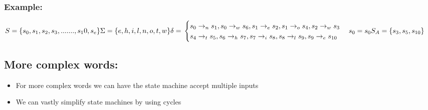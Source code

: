 \documentclass[20pt]{article}
\begin{document}
    \subsubsection*{Example:}
    $S = \{s_0, s_1, s_2, s_3, .......,s_10,s_e\}\\
    \Sigma = \{ e, h, i, l, n, o, t, w\} \\
    \delta = \\
        \begin{cases}
        s_0 \rightarrow_n s_1, s_0 \rightarrow_w s_6, s_1 \rightarrow_e s_2, s_1 \rightarrow_o s_4, s_2 \rightarrow_w s_3 
        \\s_4 \rightarrow_t s_5, s_6 \rightarrow_h s_7, s_7 \rightarrow_i s_8, s_8 \rightarrow_l s_9, s_9 \rightarrow_e s_{10} 
        \end{cases}\\
        s_0 = s_0\\
        S_A = \{s_3,s_5,s_{10}\}\\
    $

    \newpage
\subsection*{More complex words:}
        \begin{itemize}
            \item For more complex words we can have the state machine accept multiple inputs
            \item We can vastly simplify state machines by using cycles
        \end{itemize}
\end{document}
